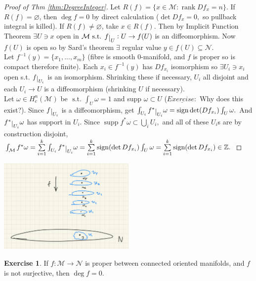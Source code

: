 \documentclass[10pt]{article}
\theoremstyle{plain}
\theoremstyle{definition}
\newtheorem{exercise}[thm]{Exercise}
\newcommand{\st}{\text{ s.t. }}
\newcommand{\man}{\mathcal{M}}
\newcommand{\nan}{\mathcal{N}}
\newcommand{\xman}{x\in\man}
\newcommand{\allthe}[3]{{#1}_{#2},...,{#1}_{#3}}
\newcommand{\sumfromto}[2]{\sum\limits_{#1}^{#2}}
\def\restrict#1{\raise-.5ex\hbox{\ensuremath|}_{#1}}
\newcommand{\compactcohomman}[1]{H_c^{#1}(\man)}
\DeclareMathOperator{\rank}{rank}
\DeclareMathOperator{\sign}{sign}
\DeclareMathOperator{\supp}{supp }
\begin{document}
\begin{proof}[Proof of Thm \ref{thm:DegreeInteger}]
Let $R(f) = \{\xman : \rank Df_x = n\}$. If $R(f) = \varnothing$, then $\deg f = 0$ by direct calculation ($\det Df_x = 0,$ so pullback integral is killed). If $R(f) \neq\varnothing$, take $x \in R(f).$ Then by Implicit Function Theorem $\exists U \ni x$ open in $\man \st f\restrict{U} : U \to f(U)$ is an diffeomorphism. Now $f(U)$ is open so by Sard's theorem $\exists$ regular value $y\in f(U) \subseteq \nan$.\\
Let $f^{-1}(y) = \{\allthe{x}{1}{m} \}$ (fibre is smooth 0-manifold, and $f$ is proper so is compact therefore finite). Each $x_i \in f^{-1}(y)$ has $Df_{x_i}$ isomorphism so $\exists U_i \ni x_i$ open s.t. $f\restrict{U_i}$ is an isomorphism. Shrinking these if necessary, $U_i$ all disjoint and each $U_i \to U$ is a diffeomorphism (shrinking $U$ if necessary).\\
Let $\omega \in \compactcohomman{n}$ be $\st \int_U \omega = 1$ and supp $\omega \subset U$ ($\underline{Exercise:}$ Why does this exist?). Since $f\restrict{U_i}$ is a diffeomorphism, get $\int_{U_i} f^* \restrict{U_i} \omega = \sign \det(Df_{x_i}) \int_U \omega.$ And $f^*\restrict{U_i} \omega$ has support in $U_i$. Since $\supp f^*\omega \subset \bigcup\limits_{i} U_i,$ and all of these $U_i$s are by construction disjoint, $\int_\man f^*\omega = \sumfromto{i=1}{k} \int_{U_i} f^*\restrict{U_i} \omega = \sumfromto{i=1}{k} \sign(\det Df_{x_i}) \int_U \omega = \sumfromto{i=1}{k} \sign (\det Df_{x_i}) \in \mathbb{Z}.$
\end{proof}
\begin{center}
    \includegraphics[width = 0.5\textwidth]{Images/DegreeCovering.png}
\end{center}

\begin{exercise}
If $f : \man \to \nan$ is proper between connected oriented manifolds, and $f$ is not surjective, then $\deg f = 0.$
\end{exercise}
\end{document}
